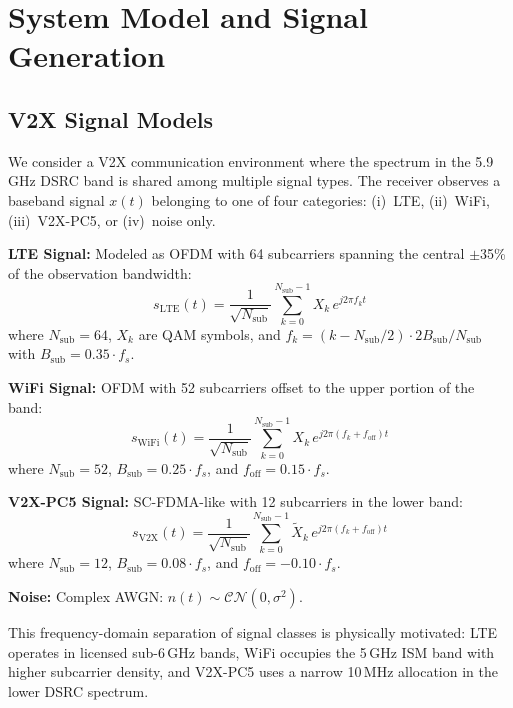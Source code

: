 \documentclass[conference]{IEEEtran}
\begin{document}
\section{System Model and Signal Generation}
\label{sec:system}

\subsection{V2X Signal Models}

We consider a V2X communication environment where the spectrum in the 5.9\,GHz DSRC band is shared among multiple signal types. The receiver observes a baseband signal $x(t)$ belonging to one of four categories: (i)~LTE, (ii)~WiFi, (iii)~V2X-PC5, or (iv)~noise only.

\noindent\textbf{LTE Signal:} Modeled as OFDM with 64 subcarriers spanning the central $\pm$35\% of the observation bandwidth:
\begin{equation}\label{eq:lte}
s_{\text{LTE}}(t) = \frac{1}{\sqrt{N_{\text{sub}}}} \sum_{k=0}^{N_{\text{sub}}-1} X_k \, e^{j 2\pi f_k t}
\end{equation}
where $N_{\text{sub}}=64$, $X_k$ are QAM symbols, and $f_k = (k - N_{\text{sub}}/2) \cdot 2B_{\text{sub}}/N_{\text{sub}}$ with $B_{\text{sub}}=0.35 \cdot f_s$.

\noindent\textbf{WiFi Signal:} OFDM with 52 subcarriers offset to the upper portion of the band:
\begin{equation}\label{eq:wifi}
s_{\text{WiFi}}(t) = \frac{1}{\sqrt{N_{\text{sub}}}} \sum_{k=0}^{N_{\text{sub}}-1} X_k \, e^{j 2\pi (f_k + f_{\text{off}}) t}
\end{equation}
where $N_{\text{sub}}=52$, $B_{\text{sub}}=0.25 \cdot f_s$, and $f_{\text{off}}=0.15 \cdot f_s$.

\noindent\textbf{V2X-PC5 Signal:} SC-FDMA-like with 12 subcarriers in the lower band:
\begin{equation}\label{eq:v2x}
s_{\text{V2X}}(t) = \frac{1}{\sqrt{N_{\text{sub}}}} \sum_{k=0}^{N_{\text{sub}}-1} \tilde{X}_k \, e^{j 2\pi (f_k + f_{\text{off}}) t}
\end{equation}
where $N_{\text{sub}}=12$, $B_{\text{sub}}=0.08 \cdot f_s$, and $f_{\text{off}}=-0.10 \cdot f_s$.

\noindent\textbf{Noise:} Complex AWGN: $n(t) \sim \mathcal{CN}(0, \sigma^2)$.

This frequency-domain separation of signal classes is physically motivated: LTE operates in licensed sub-6\,GHz bands, WiFi occupies the 5\,GHz ISM band with higher subcarrier density, and V2X-PC5 uses a narrow 10\,MHz allocation in the lower DSRC spectrum.
\end{document}

